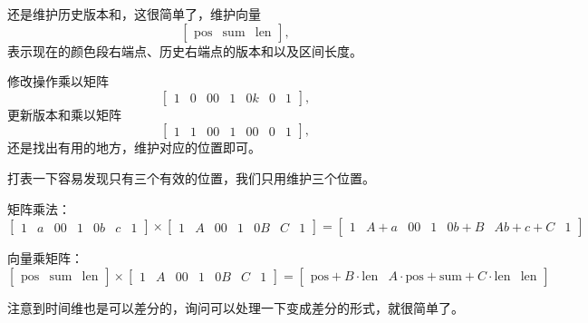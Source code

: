 \documentclass[a4paper, fontset=none]{ctexart}
\begin{document}
还是维护历史版本和，这很简单了，维护向量
\[
\begin{bmatrix} \text{pos} & \text{sum} & \text{len} \end{bmatrix},
\]
表示现在的颜色段右端点、历史右端点的版本和以及区间长度。

修改操作乘以矩阵
\[
\begin{bmatrix}
1 & 0 & 0
0 & 1 & 0
k & 0 & 1
\end{bmatrix},
\]
更新版本和乘以矩阵
\[
\begin{bmatrix}
1 & 1 & 0
0 & 1 & 0
0 & 0 & 1
\end{bmatrix},
\]
还是找出有用的地方，维护对应的位置即可。

打表一下容易发现只有三个有效的位置，我们只用维护三个位置。

矩阵乘法：
\[
\begin{bmatrix}
1 & a & 0
0 & 1 & 0
b & c & 1
\end{bmatrix}
\times
\begin{bmatrix}
1 & A & 0
0 & 1 & 0
B & C & 1
\end{bmatrix}
=
\begin{bmatrix}
1 & A + a & 0
0 & 1 & 0
b + B & Ab + c + C & 1
\end{bmatrix}
\]

向量乘矩阵：
\[
\begin{bmatrix} \text{pos} & \text{sum} & \text{len} \end{bmatrix}
\times
\begin{bmatrix}
1 & A & 0
0 & 1 & 0
B & C & 1
\end{bmatrix}
=
\begin{bmatrix}
\text{pos} + B \cdot \text{len} &
A \cdot \text{pos} + \text{sum} + C \cdot \text{len} &
\text{len}
\end{bmatrix}
\]


注意到时间维也是可以差分的，询问可以处理一下变成差分的形式，就很简单了。
\end{document}
